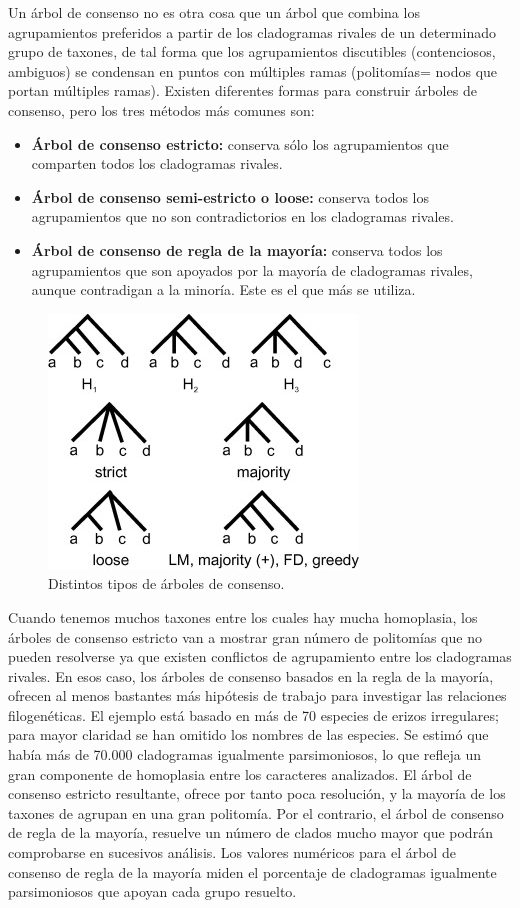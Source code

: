 Un árbol de consenso no es otra cosa que un árbol que combina los agrupamientos preferidos a partir de los cladogramas rivales de un determinado grupo de taxones, de tal forma que los agrupamientos discutibles (contenciosos, ambiguos) se condensan en puntos con múltiples ramas (politomías= nodos que portan múltiples ramas). Existen diferentes formas para construir árboles de consenso, pero los tres métodos más comunes son: \begin{itemize}
\item \textbf{Árbol de consenso estricto:} conserva sólo los agrupamientos que comparten todos los cladogramas rivales.
\item \textbf{Árbol de consenso semi-estricto o loose:} conserva todos los agrupamientos que no son contradictorios en los cladogramas rivales.
\item \textbf{Árbol de consenso de regla de la mayoría:} conserva todos los agrupamientos que son apoyados por la mayoría de cladogramas rivales, aunque contradigan a la minoría. Este es el que más se utiliza.
\end{itemize}

\begin{figure}[htbp]
\centering
\includegraphics[width=0.5\linewidth]{figs/consensus-trees-types.jpg}
\caption{Distintos tipos de árboles de consenso.}
\end{figure}

Cuando tenemos muchos taxones entre los cuales hay mucha homoplasia, los árboles de consenso estricto van a mostrar gran número de politomías que no pueden resolverse ya que existen conflictos de agrupamiento entre los cladogramas rivales. En esos caso, los árboles de consenso basados en la regla de la mayoría, ofrecen al menos bastantes más hipótesis de trabajo para investigar las relaciones filogenéticas. El ejemplo está basado en más de 70 especies de erizos irregulares; para mayor claridad se han omitido los nombres de las especies. Se estimó que había más de 70.000 cladogramas igualmente parsimoniosos, lo que refleja un gran componente de homoplasia entre los caracteres analizados. El árbol de consenso estricto resultante, ofrece por tanto poca resolución, y la mayoría de los taxones de agrupan en una gran politomía. Por el contrario, el árbol de consenso de regla de la mayoría, resuelve un número de clados mucho mayor que podrán comprobarse en sucesivos análisis. Los valores numéricos para el árbol de consenso de regla de la mayoría miden el porcentaje de cladogramas igualmente parsimoniosos que apoyan cada grupo resuelto.

